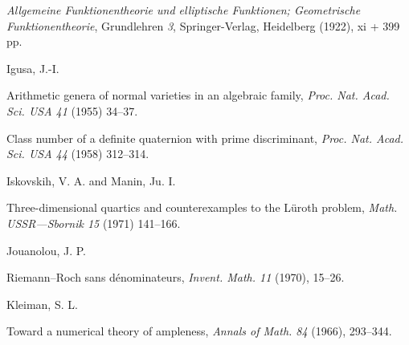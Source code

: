 {\noindent\hangindent=25bp\hspace*{6bp}%
\emph{Allgemeine Funktionentheorie und elliptische Funktionen; Geometrische Funktionentheorie}, Grundlehren \emph{3}, Springer-Verlag, Heidelberg (1922), xi + 399 pp.\par
\par\vspace{2.15pt}\noindent \hypertarget{bib-478-4}{}Igusa, J.-I.\par
\noindent\hangindent=25bp\hspace*{6bp}%
Arithmetic genera of normal varieties in an algebraic family, \emph{Proc. Nat. Acad. Sci. USA 41} (1955) 34--37.\par
\noindent\hangindent=25bp\hspace*{6bp}%
Class number of a definite quaternion with prime discriminant, \emph{Proc. Nat. Acad. Sci. USA 44} (1958) 312--314.\par
\par\vspace{2.15pt}\noindent \hypertarget{bib-478-6}{}Iskovskih, V. A. and Manin, Ju. I.\par
\noindent\hangindent=25bp\hspace*{6bp}%
Three-dimensional quartics and counterexamples to the L\"uroth problem, \emph{Math. USSR---Sbornik 15} (1971) 141--166.\par
\par\vspace{2.15pt}\noindent \hypertarget{bib-478-7}{}Jouanolou, J. P.\par
\noindent\hangindent=25bp\hspace*{6bp}%
Riemann--Roch sans d\'enominateurs, \emph{Invent. Math. 11} (1970), 15--26.\par
\par\vspace{2.15pt}\noindent \hypertarget{bib-478-8}{}Kleiman, S. L.\par
\noindent\hangindent=25bp\hspace*{6bp}%
Toward a numerical theory of ampleness, \emph{Annals of Math. 84} (1966), 293--344.\par
}
